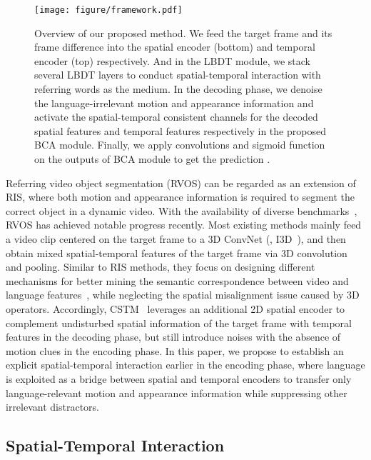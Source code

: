 \documentclass[10pt,twocolumn,letterpaper]{article}
\begin{document}
\begin{figure*}[t]
	\centering
		\texttt{[image: figure/framework.pdf]}
	\caption{Overview of our proposed method. We feed the target frame  and its frame difference  into the spatial encoder (bottom) and temporal encoder (top) respectively. And in the LBDT module, we stack several LBDT layers to conduct spatial-temporal interaction with referring words as the medium. In the decoding phase, we denoise the language-irrelevant motion and appearance information and activate the spatial-temporal consistent channels for the decoded spatial features  and temporal features  respectively in the proposed BCA module. Finally, we apply convolutions and sigmoid function on the outputs of BCA module to get the prediction .}

	\label{fig:framework}
	
\end{figure*}

Referring video object segmentation (RVOS) can be regarded as an extension of RIS, where both motion and appearance information is required to segment the correct object in a dynamic video.
With the availability of diverse benchmarks~\cite{GavrilyukGLS18,khoreva2018video,seo2020urvos}, RVOS has achieved notable progress recently.
Most existing methods mainly feed a video clip centered on the target frame to a 3D ConvNet (\eg, I3D~\cite{CarreiraZ17}), and then obtain mixed spatial-temporal features of the target frame via 3D convolution and pooling.
Similar to RIS methods, they focus on designing different mechanisms for better mining the semantic correspondence between video and language features~\cite{WangDYT19,ye2021referring,NingXW020,GavrilyukGLS18, WangDMY20,mcintosh2020visual}, while neglecting the spatial misalignment issue caused by 3D operators.
Accordingly, CSTM~\cite{HuiH0DLWH021} leverages an additional 2D spatial encoder to complement undisturbed spatial information of the target frame with temporal features in the decoding phase, but still introduce noises with the absence of motion clues in the encoding phase.
In this paper, we propose to establish an explicit spatial-temporal interaction earlier in the encoding phase, where language is exploited as a bridge between spatial and temporal encoders to transfer only language-relevant motion and appearance information while suppressing other irrelevant distractors.

\subsection{Spatial-Temporal Interaction}
\label{sec:related:stm}
\end{document}
